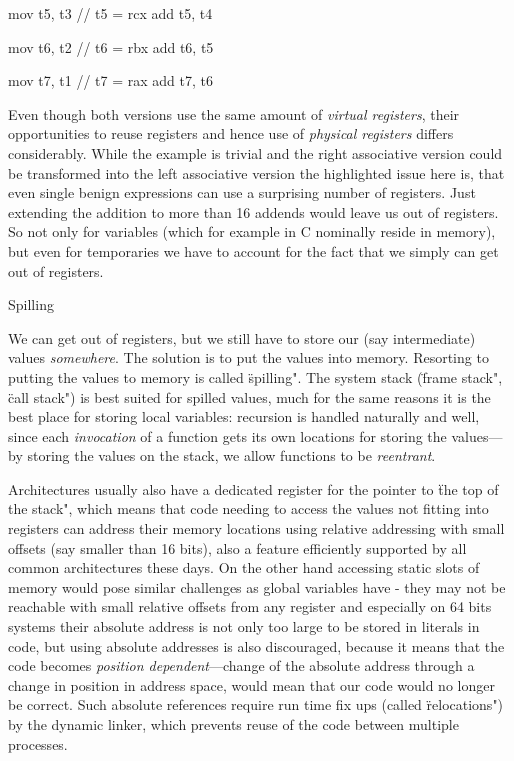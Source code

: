 mov t5, t3 // t5 = rcx
add t5, t4

mov t6, t2 // t6 = rbx
add t6, t5

mov t7, t1 // t7 = rax
add t7, t6
\endtt

Even though both versions use the same amount of {\em virtual registers}, their
opportunities to reuse registers and hence use of {\em physical registers}
differs considerably. While the example is trivial and the right associative
version could be transformed into the left associative version the highlighted
issue here is, that even single benign expressions can use a surprising number of
registers. Just extending the addition to more than 16 addends would leave us
out of registers. So not only for variables (which for example in C nominally
reside in memory), but even for temporaries we have to account for the fact that
we simply can get out of registers.

\sec Spilling

We can get out of registers, but we still have to store our (say intermediate)
values {\em somewhere}. The solution is to put the values into memory. Resorting
to putting the values to memory is called \"spilling".
The system stack (\"frame stack", \"call stack") is best suited for spilled
values, much for the same reasons it is the best place for storing local
variables: recursion is handled naturally and well, since each {\em invocation}
of a function gets its own locations for storing the values---by storing the
values on the stack, we allow functions to be {\em reentrant}.

Architectures usually also have a dedicated register for the pointer to \"the
top of the stack", which means that code needing to access the values not
fitting into registers can address their memory locations using relative
addressing with small offsets (say smaller than 16 bits), also a feature
efficiently supported by all common architectures these days. On the other hand
accessing static slots of memory would pose similar challenges as global
variables have - they may not be reachable with small relative offsets from any
register and especially on 64 bits systems their absolute address is not only too large
to be stored in literals in code, but using absolute addresses is also
discouraged, because it means that the code becomes {\em position
dependent}---change of the absolute address through a change in position in
address space, would mean that our code would no longer be correct. Such
absolute references require run time fix ups (called \"relocations") by the
dynamic linker, which prevents reuse of the code between multiple processes.

